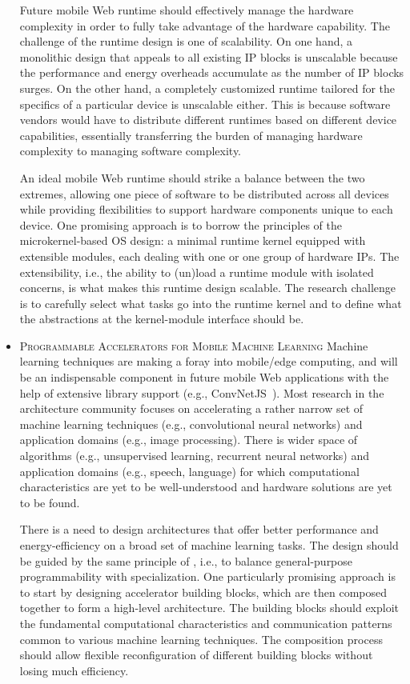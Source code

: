 \begin{itemize}
  Future mobile Web runtime should effectively manage the hardware complexity in order to fully take advantage of the hardware capability. The challenge of the runtime design is one of scalability. On one hand, a monolithic design that appeals to all existing IP blocks is unscalable because the performance and energy overheads accumulate as the number of IP blocks surges. On the other hand, a completely customized runtime tailored for the specifics of a particular device is unscalable either. This is because software vendors would have to distribute different runtimes based on different device capabilities, essentially transferring the burden of managing hardware complexity to managing software complexity.
  
  An ideal mobile Web runtime should strike a balance between the two extremes, allowing one piece of software to be distributed across all devices while providing flexibilities to support hardware components unique to each device. One promising approach is to borrow the principles of the microkernel-based OS design: a minimal runtime kernel equipped with extensible modules, each dealing with one or one group of hardware IPs. The extensibility, i.e., the ability to (un)load a runtime module with isolated concerns, is what makes this runtime design scalable. The research challenge is to carefully select what tasks go into the runtime kernel and to define what the abstractions at the kernel-module interface should be.
  
  \item \textsc{Programmable Accelerators for Mobile Machine Learning} Machine learning techniques are making a foray into mobile/edge computing, and will be an indispensable component in future mobile Web applications with the help of extensive library support (e.g., ConvNetJS~\cite{convnetjs}). Most research in the architecture community focuses on accelerating a rather narrow set of machine learning techniques (e.g., convolutional neural networks) and application domains (e.g., image processing). There is wider space of algorithms (e.g., unsupervised learning, recurrent neural networks) and application domains (e.g., speech, language) for which computational characteristics are yet to be well-understood and hardware solutions are yet to be found.
    
  There is a need to design architectures that offer better performance and energy-efficiency on a broad set of machine learning tasks. The design should be guided by the same principle of \webcore, i.e., to balance general-purpose programmability with specialization. One particularly promising approach is to start by designing accelerator building blocks, which are then composed together to form a high-level architecture. The building blocks should exploit the fundamental computational characteristics and communication patterns common to various machine learning techniques. The composition process should allow flexible reconfiguration of different building blocks without losing much efficiency.
  

\end{itemize}
